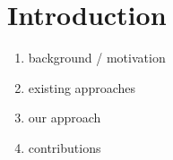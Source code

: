 \section{Introduction}

\begin{enumerate}
	\item background / motivation
	\item existing approaches
	\item our approach
	\item contributions
\end{enumerate}